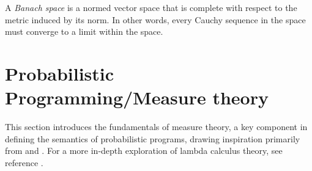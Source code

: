 \begin{definition}
  A \emph{Banach space} is a normed vector space that is complete with respect to the metric induced by its norm. In other words, every Cauchy sequence in the space must converge to a limit within the space.
\end{definition}








\section{Probabilistic Programming/Measure theory} \label{sec:pp}

 This section introduces the fundamentals of measure theory, a key component in defining the semantics of probabilistic programs, drawing inspiration primarily from \cite{dahlqvistSemanticsProbabilisticProgramming2020a} and \cite{athreyaMeasureTheoryProbability2006}. For a more in-depth exploration of lambda calculus theory, see reference \cite{aliprantisBanachLattices1999}. 


